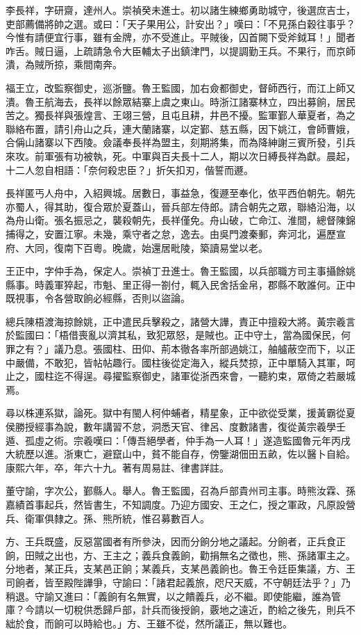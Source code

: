 \begin{pinyinscope}
李長祥，字研齋，達州人。崇禎癸未進士。初以諸生練鄉勇助城守，後選庶吉士，吏部薦備將帥之選。或曰：「天子果用公，計安出？」嘆曰：「不見孫白穀往事乎？今惟有請便宜行事，雖有金牌，亦不受進止。平賊後，囚首闕下受斧鉞耳！」聞者咋舌。賊日逼，上疏請急令大臣輔太子出鎮津門，以提調勤王兵。不果行，而京師潰，為賊所掠，乘間南奔。

福王立，改監察御史，巡浙鹽。魯王監國，加右僉都御史，督師西行，而江上師又潰。魯王航海去，長祥以餘眾結寨上虞之東山。時浙江諸寨林立，四出募餉，居民苦之。獨長祥與張煌言、王翊三營，且屯且耕，井邑不擾。監軍鄞人華夏者，為之聯絡布置，請引舟山之兵，連大蘭諸寨，以定鄞、慈五縣，因下姚江，會師曹娥，合偁山諸寨以下西陵。僉議奉長祥為盟主，刻期將集，而為降紳謝三賓所發，引兵來攻。前軍張有功被執，死。中軍與百夫長十二人，期以次日縛長祥為獻。晨起，十二人忽自相語：「奈何殺忠臣？」折矢扣刃，偕誓而遯。

長祥匿丐人舟中，入紹興城。居數日，事益急，復遯至奉化，依平西伯朝先。朝先亦蜀人，得其助，復合眾於夏蓋山，晉兵部左侍郎。請合朝先之眾，聯絡沿海，以為舟山衛。張名振忌之，襲殺朝先，長祥僅免。舟山破，亡命江、淮間，總督陳錦捕得之，安置江寧。未幾，乘守者之怠，逸去。由吳門渡秦郵，奔河北，遍歷宣府、大同，復南下百粵。晚歲，始還居毗陵，築讀易堂以老。

王正中，字仲手為，保定人。崇禎丁丑進士。魯王監國，以兵部職方司主事攝餘姚縣事。時義軍猝起，市魁、里正得一劄付，輒入民舍括金帛，郡縣不敢誰何。正中既視事，令各營取餉必經縣，否則以盜論。

總兵陳梧渡海掠餘姚，正中遣民兵擊殺之，諸營大譁，責正中擅殺大將。黃宗羲言於監國曰：「梧借喪亂以濟其私，致犯眾怒，是賊也。正中守土，當為國保民，何罪之有？」議乃息。張國柱、田仰、荊本徹各率所部過姚江，舳艫蔽空而下，以正中嚴備，不敢犯，皆帖帖趣行。國柱後從定海入，縱兵焚掠，正中單騎入其軍，呵止之，國柱迄不得逞。尋擢監察御史，諸軍從浙西來會，一聽約束，眾倚之若嚴城焉。

尋以株連系獄，論死。獄中有閩人柯仲蜅者，精星象，正中欲從受業，援黃霸從夏侯勝授經事為說，數年講習不怠，洞悉天官、律呂、度數諸書，復從黃宗羲學壬遁、孤虛之術。宗羲嘆曰：「傳吾絕學者，仲手為一人耳！」遂造監國魯元年丙戌大統歷以進。浙東亡，避竄山中，貧不能自存，傍鑒湖佃田五畝，佐以醫卜自給。康熙六年，卒，年六十九。著有周易註、律書詳註。

董守諭，字次公，鄞縣人。舉人。魯王監國，召為戶部貴州司主事。時熊汝霖、孫嘉績首事起兵，然皆書生，不知調度。乃迎方國安、王之仁，授之軍政，凡原設營兵、衛軍俱隸之。孫、熊所統，惟召募數百人。

方、王兵既盛，反惡當國者有所參決，因而分餉分地之議起。分餉者，正兵食正餉，田賊之出也，方、王主之；義兵食義餉，勸捐無名之徵也，熊、孫諸軍主之。分地者，某正兵，支某邑正餉；某義兵，支某邑義餉也。魯王令廷臣集議，方、王司餉者，皆至殿陛譁爭，守諭曰：「諸君起義旅，咫尺天威，不守朝廷法乎？」乃稍退。守諭又進曰：「義餉有名無實，以之饋義兵，必不繼。即使能繼，誰為管庫？今請以一切稅供悉歸戶部，計兵而後授餉，覈地之遠近，酌給之後先，則兵不絀於食，而餉可以時給也。」方、王雖不從，然所議正，無以難也。


\end{pinyinscope}
